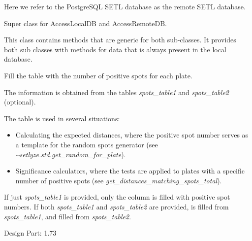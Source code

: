 \documentclass[letterpaper,10pt,english]{sphinxmanual}
\begin{document}
Here we refer to the PostgreSQL SETL database as the remote SETL
database.

\begin{fulllineitems}
\label{setlyze/database:setlyze.database.AccessDBGeneric}
Super class for AccessLocalDB and AccessRemoteDB.

This class contains methods that are generic for both sub-classes.
It provides both sub classes with methods for data that is always
present in the local database.

\begin{fulllineitems}
\label{setlyze/database:setlyze.database.AccessDBGeneric.fill_plate_spot_totals_table}
Fill the  table with the number of
positive spots for each plate.

The information is obtained from the tables \emph{spots\_table1} and
\emph{spots\_table2} (optional).

The  table is used in several situations:
\begin{itemize}
\item {} 
Calculating the expected distances, where the positive spot
number serves as a template for the random spots generator
(see \emph{\textasciitilde{}setlyze.std.get\_random\_for\_plate}).

\item {} 
Significance calculators, where the tests are applied to
plates with a specific number of positive spots (see
\emph{get\_distances\_matching\_spots\_total}).

\end{itemize}

If just \emph{spots\_table1} is provided, only the column 
is filled with positive spot numbers. If both \emph{spots\_table1} and
\emph{spots\_table2} are provided,  is filled
from \emph{spots\_table1}, and  filled from \emph{spots\_table2}.

Design Part: 1.73

\end{fulllineitems}



\end{fulllineitems}
\end{document}
